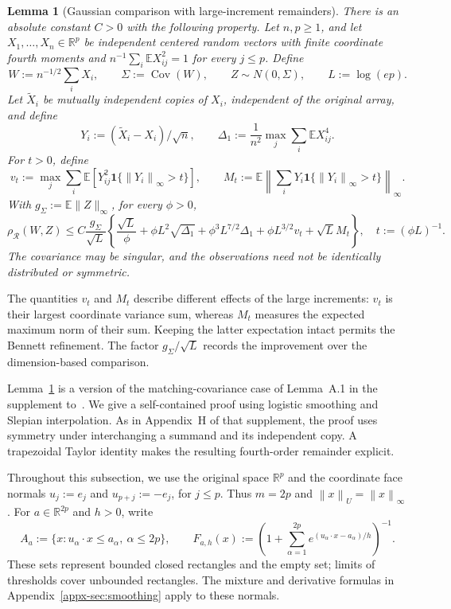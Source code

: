 \documentclass[11pt,letterpaper]{article}
\newtheorem{lemma}{Lemma}
\theoremstyle{remark}
\newcommand{\E}{\mathbb E}
\newcommand{\R}{\mathbb R}
\newcommand{\Cov}{\operatorname{Cov}}
\newcommand{\norm}[1]{\left\lVert#1\right\rVert}
\newcommand{\rh}{\rho_{\mathcal R}}
\newcommand{\ind}{\mathbf 1}
\begin{document}
\begin{lemma}[Gaussian comparison with large-increment remainders]
\label{ben:comparison}
There is an absolute constant $C>0$ with the following property.
Let $n,p\ge1$, and let $X_1,\ldots,X_n\in\R^p$ be independent
centered random vectors with finite coordinate fourth moments and
$n^{-1}\sum_i\E X_{ij}^2=1$ for every $j\le p$. Define
\[
 W:=n^{-1/2}\sum_iX_i,\qquad \Sigma:=\Cov(W),\qquad
 Z\sim N(0,\Sigma),\qquad L:=\log(ep).
\]
Let $\widetilde X_i$ be mutually independent copies of $X_i$,
independent of the original array, and define
\[
 Y_i:=(\widetilde X_i-X_i)/\sqrt n,\qquad
 \Delta_1:=\frac1{n^2}\max_j\sum_i\E X_{ij}^4.
\]
For $t>0$, define
\[
 v_t:=\max_j\sum_i\E[Y_{ij}^2\ind\{\norm{Y_i}_\infty>t\}],
 \qquad M_t:=\E\norm{\sum_iY_i\ind\{\norm{Y_i}_\infty>t\}}_\infty.
\]
With $g_\Sigma:=\E\|Z\|_\infty$, for every $\phi>0$,
\begin{equation}
 \rh(W,Z)\le C\frac{g_\Sigma}{\sqrt L}\left\{
 \frac{\sqrt L}{\phi}+\phi L^2\sqrt{\Delta_1}
 +\phi^3L^{7/2}\Delta_1+\phi L^{3/2}v_t+\sqrt L M_t\right\},
 \quad t:=(\phi L)^{-1}.
 \label{ben:master}
\end{equation}
The covariance may be singular, and the observations need not be
identically distributed or symmetric.
\end{lemma}

The quantities $v_t$ and $M_t$ describe different effects of the
large increments: $v_t$ is their largest coordinate variance sum,
whereas $M_t$ measures the expected maximum norm of their sum.
Keeping the latter expectation intact permits the Bennett refinement.
The factor $g_\Sigma/\sqrt L$ records the improvement over the
dimension-based comparison.

Lemma~\ref{ben:comparison} is a version of the matching-covariance
case of Lemma~A.1 in the supplement to~\cite{CCKK2022}. We give
a self-contained proof using logistic smoothing and Slepian
interpolation. As in Appendix~H of that supplement, the proof uses
symmetry under interchanging a summand and its independent copy.
A trapezoidal Taylor identity makes the resulting fourth-order
remainder explicit.

Throughout this subsection, we use the original space $\R^p$ and
the coordinate face normals $u_j:=e_j$ and $u_{p+j}:=-e_j$,
for $j\le p$. Thus $m=2p$ and $\norm x_U=\norm x_\infty$.
For $a\in\R^{2p}$ and $h>0$, write
\[
 A_a:=\{x:u_\alpha\cdot x\le a_\alpha,\ \alpha\le2p\},\qquad
 F_{a,h}(x):=\left(1+\sum_{\alpha=1}^{2p}
          e^{(u_\alpha\cdot x-a_\alpha)/h}\right)^{-1}.
\]
These sets represent bounded closed rectangles and the empty set;
limits of thresholds cover unbounded rectangles. The mixture and
derivative formulas in Appendix~\ref{appx-sec:smoothing} apply to
these normals.
\end{document}
